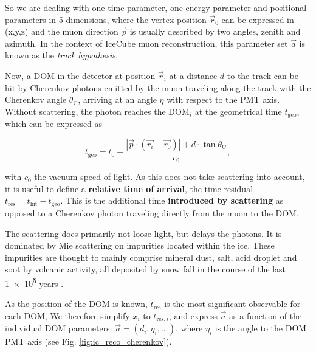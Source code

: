 So we are dealing with one time parameter, one energy parameter and positional parameters in 5 dimensions, where the vertex position $\vec{r}_0$ can be expressed in (x,y,z) and the muon direction $\vec{p}$ is usually described by two angles, zenith and azimuth. In the context of IceCube muon reconstruction, this parameter set $\vec{a}$ is known as the \textit{track hypothesis}.

Now, a DOM in the detector at position $\vec{r}_i$ at a distance $d$ to the track can be hit by Cherenkov photons emitted by the muon traveling along the track with the Cherenkov angle $\theta_\text{C}$, arriving at an angle $\eta$ with respect to the PMT axis. Without scattering, the photon reaches the $\text{DOM}_i$ at the geometrical time $t_\text{geo}$, which can be expressed as

\begin{equation}
t_\text{geo} = t_0 + \frac{|\vec{p}\cdot(\vec{r_i}-\vec{r_0})|+d\cdot \tan{\theta_\text{C}}}{c_0},
\end{equation}

with $c_0$ the vacuum speed of light. As this does not take scattering into account, it is useful to define a \textbf{relative time of arrival}, the time residual $t_\text{res} = t_\text{hit} - t_\text{geo}$. This is the additional time \textbf{introduced by scattering} as opposed to a Cherenkov photon traveling directly from the muon to the DOM.

The scattering does primarily not loose light, but delays the photons. It is dominated by Mie scattering on impurities located within the ice. These impurities are thought to mainly comprise mineral dust, salt, acid droplet and soot by volcanic activity, all deposited by snow fall in the course of the last \num{1e5} years .

As the position of the DOM is known, $t_\text{res}$ is the most significant observable for each DOM,  We therefore simplify $x_i$ to $t_{\text{res},i}$, and express $\vec{a}$ as a function of the individual DOM parameters: $\vec{a}= (d_i,\eta_i,...)$, where $\eta_i$ is the angle to the DOM PMT axis (see Fig. \ref{fig:ic_reco_cherenkov}).


